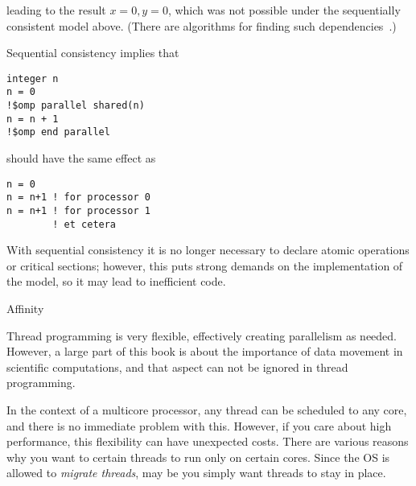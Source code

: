 leading to the result $x=0,y=0$, which was not possible under the
sequentially consistent model above. (There are algorithms for finding
such dependencies~\cite{KrishnaYelick:cycledetect}.)


Sequential consistency implies that
\begin{verbatim}
integer n
n = 0
!$omp parallel shared(n)
n = n + 1
!$omp end parallel
\end{verbatim}
should have the same effect as
\begin{verbatim}
n = 0
n = n+1 ! for processor 0
n = n+1 ! for processor 1
        ! et cetera
\end{verbatim}
With sequential consistency it is no longer necessary to declare
atomic operations or critical sections; however, this puts strong
demands on the implementation of the model, so it may lead to
inefficient code.

\begin{comment}
  \begin{exercise}
    In section~\ref{sec:shared-lock} you saw an example that needed
    a critical section to get the right final result. Argue that
    having a critical section is not enough for sequential consistency.
    \begin{itemize}
    \item Write a piece of sequential code that, when executed in parallel,
      corresponds to the example in section~\ref{sec:shared-lock}.
    \item Show that, using a critical section, there are two execution
      orderings that give the correct result.
    \item Show that one of these orderings is not sequentially consistent.
    \end{itemize}
  \end{exercise}
\end{comment}

 {Affinity}

Thread programming is very flexible, effectively creating parallelism
as needed. However, a large part of this book is about the importance
of data movement in scientific computations, and that aspect can not
be ignored in thread programming.

In the context of a multicore processor, any thread can be scheduled
to any core, and there is no immediate problem with this. However, if
you care about high performance, this flexibility can have unexpected
costs. There are various reasons why you want to certain threads to
run only on certain cores. Since the \ac{OS} is allowed to
\emph{migrate threads}, may be you simply want
threads to stay in place.

